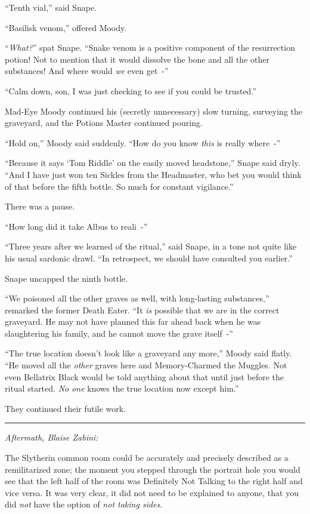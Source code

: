 ``Tenth vial,'' said Snape.

``Basilisk venom,'' offered Moody.

``\emph{What?}'' spat Snape. ``Snake venom is a positive component of the resurrection potion! Not to mention that it would dissolve the bone and all the other substances! And where would \emph{we} even get~-''

``Calm down, son, I was just checking to see if you could be trusted.''

Mad-Eye Moody continued his (secretly unnecessary) slow turning, surveying the graveyard, and the Potions Master continued pouring.

``Hold on,'' Moody said suddenly. ``How do you know \emph{this} is really where~-''

``Because it says `Tom Riddle' on the easily moved headstone,'' Snape said dryly. ``And I have just won ten Sickles from the Headmaster, who bet you would think of that before the fifth bottle. So much for constant vigilance.''

There was a pause.

``How long did it take Albus to reali~-''

``Three years after we learned of the ritual,'' said Snape, in a tone not quite like his usual sardonic drawl. ``In retrospect, we should have consulted you earlier.''

Snape uncapped the ninth bottle.

``We poisoned all the other graves as well, with long-lasting substances,'' remarked the former Death Eater. ``It \emph{is} possible that we are in the correct graveyard. He may not have planned this far ahead back when he was slaughtering his family, and he cannot move the grave itself~-''

``The true location doesn't look like a graveyard any more,'' Moody said flatly. ``He moved all the \emph{other} graves here and Memory-Charmed the Muggles. Not even Bellatrix Black would be told anything about that until just before the ritual started. \emph{No one} knows the true location now except him.''

They continued their futile work.

\begin{center}\rule{3in}{0.4pt}\end{center}

\emph{Aftermath, Blaise Zabini:}

The Slytherin common room could be accurately and precisely described as a remilitarized zone; the moment you stepped through the portrait hole you would see that the left half of the room was Definitely Not Talking to the right half and vice versa. It was very clear, it did not need to be explained to anyone, that you did \emph{not} have the option of \emph{not taking sides}.

